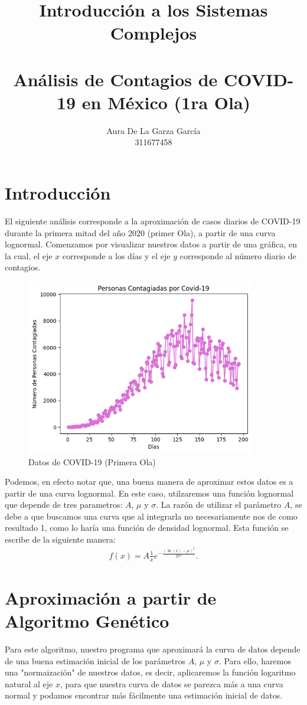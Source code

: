 \documentclass{article}
\title{Introducci\'on a los Sistemas Complejos\\
\large \quad \\
\large \textbf{An\'alisis de Contagios de COVID-19 en M\'exico (1ra Ola)}
}
\author{Aura De La Garza Garc\'ia\\
311677458}
\date{}
\theoremstyle{definition}
\begin{document}
\maketitle
\section{Introducci\'on}
El siguiente an\'alisis corresponde a la aproximaci\'on de casos diarios de COVID-19 durante la primera mitad del año 2020 (primer Ola), a partir de una curva lognormal. Comenzamos por visualizar nuestros datos a partir de una gr\'afica, en la cual, el eje $x$ corresponde a los d\'ias y el eje $y$ corresponde al n\'umero diario de contagios.

\begin{figure}[htp]
    \centering
    \includegraphics[width=10cm]{covid_casos.png}
    \caption{Datos de COVID-19 (Primera Ola)}
    \label{fig:covdatos}
\end{figure}

Podemos, en efecto notar que, una buena manera de aproximar estos datos es a partir de una curva lognormal. En este caso, utilzaremos una funci\'on lognormal que depende de tres parametros: $A$, $\mu$ y $\sigma$. La raz\'on de utilizar el par\'ametro $A$, se debe a que buscamos una curva que al integrarla no necesariamente nos de como resultado 1, como lo har\'ia una funci\'on de densidad lognormal. Esta funci\'on se escribe de la siguiente manera:
\begin{align*}
    f(x)=A\frac{1}{x}e^{-\frac{(\ln{(x)}-\mu)^2}{2\sigma ^2}}.
\end{align*}

\section{Aproximaci\'on a partir de Algoritmo Gen\'etico}
Para este algoritmo, nuestro programa que aproximar\'a la curva de datos depende de una buena estimaci\'on inicial de los par\'ametros $A$, $\mu$ y $\sigma$. Para ello, haremos una "normaizaci\'on" de nuestros datos, es decir, aplicaremos la funci\'on logaritmo natural al eje $x$, para que nuestra curva de datos se parezca m\'as a una curva normal y podamos encontrar m\'as f\'acilmente una estimaci\'on inicial de datos. 
\end{document}
